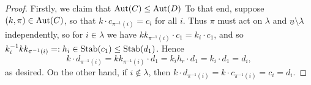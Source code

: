 \documentclass[a4paper,10pt
,draft
]{article}%
\renewcommand{\1}{\eta}%
\begin{document}
\begin{proof}
      Firstly, we claim that $\operatorname{Aut}(C) \leq \operatorname{Aut}(D)$
      To that end, suppose $(k,\pi)\in \operatorname{Aut}(C)$, so that $k \cdot c_{\pi^{-1}(i)} = c_i$ for all $i$.
      Thus $\pi$ must act on $\lambda$ and $\underline{n} \setminus \lambda$ independently,
      so for $i \in \lambda$ we have %
      $k k_{\pi^{-1}(i)} \cdot c_1 = k_i \cdot c_1$, and so
      $k_i^{-1} k k_{\pi^{-1}(i)} =:h_i \in \mathrm{Stab}(c_1) \leq \mathrm{Stab}(d_1)$. Hence 
      \begin{equation}
            \label{STAB_KT_EQ}
            k \cdot d_{\pi^{-1}(i)} = k k_{\pi^{-1}(i)} \cdot d_1 = k_i h_r \cdot d_1 = k_i \cdot d_1 = d_i,
      \end{equation}
      as desired.
      On the other hand, if $i \not \in \lambda$, then
      $k \cdot d_{\pi^{-1}(i)} = k \cdot c_{\pi^{-1}(i)} = c_i = d_i$.
      

\end{proof}
\end{document}
